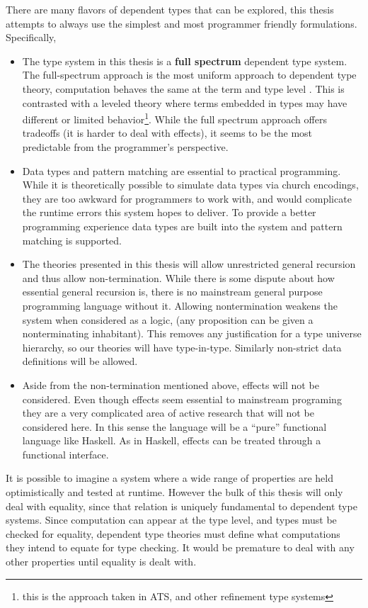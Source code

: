 There are many flavors of dependent types that can be explored, this thesis attempts to always use the simplest and most programmer friendly formulations.
Specifically,
\begin{itemize}
\item The type system in this thesis is a \textbf{full spectrum} dependent type system.
The full-spectrum approach is the most uniform approach to dependent type theory, computation behaves the same at the term and type level \cite{10.1145/289423.289451,norell2007towards,brady2013idris,sjoberg2012irrelevance}.
This is contrasted with a leveled theory where terms embedded in types may have different or limited behavior\footnote{this is the approach taken in ATS, and other refinement type systems}.
While the full spectrum approach offers tradeoffs (it is harder to deal with effects), it seems to be the most predictable from the programmer's perspective.
\item Data types and pattern matching are essential to practical programming.
While it is theoretically possible to simulate data types via church encodings, they are too awkward for programmers to work with, and would complicate the runtime errors this system hopes to deliver.
To provide a better programming experience data types are built into the system and pattern matching is supported.
\item The theories presented in this thesis will allow unrestricted general recursion and thus allow non-termination.
While there is some dispute about how essential general recursion is, there is no mainstream general purpose programming language without it.
Allowing nontermination weakens the system when considered as a logic, (any proposition can be given a nonterminating inhabitant).
This removes any justification for a type universe hierarchy, so our theories will have type-in-type. Similarly non-strict data definitions will be allowed.
\item Aside from the non-termination mentioned above, effects will not be considered.
Even though effects seem essential to mainstream programing they are a very complicated area of active research that will not be considered here.
In this sense the language will be a ``pure'' functional language like Haskell.
As in Haskell, effects can be treated through a functional interface.
\end{itemize}
It is possible to imagine a system where a wide range of properties are held optimistically and tested at runtime.
However the bulk of this thesis will only deal with equality, since that relation is uniquely fundamental to dependent type systems.
Since computation can appear at the type level, and types must be checked for equality, dependent type theories must define what computations they intend to equate for type checking.
It would be premature to deal with any other properties until equality is dealt with.

